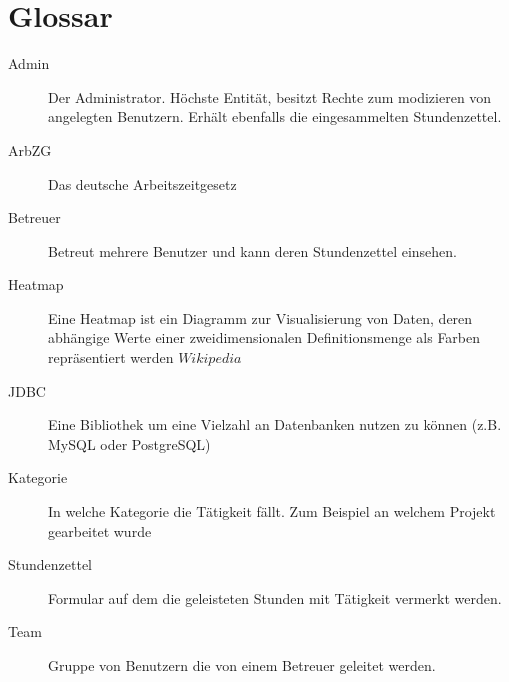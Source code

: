 \section{Glossar}
\begin{description}
	\item[Admin] Der Administrator. Höchste Entität, besitzt Rechte zum modizieren von angelegten Benutzern.
	               Erhält ebenfalls die eingesammelten Stundenzettel.

	\item[ArbZG] Das deutsche Arbeitszeitgesetz

	\item[Betreuer] Betreut mehrere Benutzer und kann deren Stundenzettel einsehen.

	\item[Heatmap] Eine Heatmap ist ein Diagramm zur Visualisierung von Daten, deren abhängige Werte einer zweidimensionalen Definitionsmenge als Farben repräsentiert werden \(Wikipedia\)

	\item[JDBC] Eine Bibliothek um eine Vielzahl an Datenbanken nutzen zu können (z.B. MySQL oder PostgreSQL)

	\item[Kategorie] In welche Kategorie die Tätigkeit fällt. Zum Beispiel an welchem Projekt gearbeitet wurde

	\item[Stundenzettel] Formular auf dem die geleisteten Stunden mit Tätigkeit vermerkt werden.

	\item[Team] Gruppe von Benutzern die von einem Betreuer geleitet werden.

\end{description}
